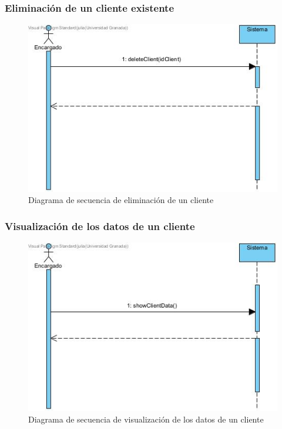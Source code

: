 \subsubsection{Eliminación de un cliente existente}

\begin{figure}[H]
	\centering
	\includegraphics[width=1\textwidth]{imagenes/imagenesDiagramas/Cliente/eliminarCliente.jpg}
	\caption{Diagrama de secuencia de eliminación de un cliente}
	\label{fig:seqdiag14}
\end{figure}

\subsubsection{Visualización de los datos de un cliente}

\begin{figure}[H]
	\centering
	\includegraphics[width=1\textwidth]{imagenes/imagenesDiagramas/Cliente/visualizarDatosCliente.jpg}
	\caption{Diagrama de secuencia de visualización de los datos de un cliente}
	\label{fig:seqdiag15}
\end{figure}

